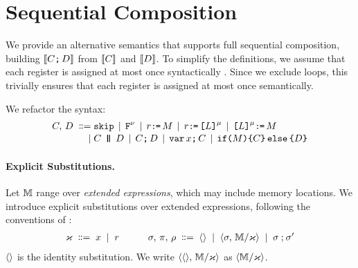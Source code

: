 \section{Sequential Composition}
\label{sec:semicolon}
We provide an alternative semantics that supports full sequential
composition, building $\llbracket C\texttt{;}\,\allowbreak D\rrbracket$ from $\llbracket C\rrbracket$ and
$\llbracket D\rrbracket$.  To simplify the definitions, we assume that each register is
assigned at most once syntactically
\cite{Rosen:1988:GVN:73560.73562}.  Since we exclude loops, this trivially ensures that each
register is assigned at most once semantically.

We refactor the syntax:
\begin{align*}
  \aCmd,\,\bCmd
  \BNFDEF& \SKIP
  \mkern-2mu\BNFSEP\mkern-2mu \FENCE^{\fmode}
  \mkern-2mu\BNFSEP\mkern-2mu \aReg\GETS\aExp
  \mkern-2mu\BNFSEP\mkern-2mu \aReg\GETS \REF{\cExp}^{\amode} 
  \mkern-2mu\BNFSEP\mkern-2mu \REF{\cExp}^{\amode}\GETS\aExp
  \\[-.5ex]
  \BNFSEP&\aCmd \PAR \bCmd
  \mkern-2mu\BNFSEP\mkern-2mu\aCmd \SEMI \bCmd
  \mkern-2mu\BNFSEP\mkern-2mu \VAR\aLoc\SEMI \aCmd
  \mkern-2mu\BNFSEP\mkern-2mu \IF{\aExp} \THEN \aCmd \ELSE \bCmd \FI
\end{align*}

\paragraph{Explicit Substitutions.}
Let $\mathbb{M}$ range over \emph{extended expressions}, which may include memory
locations.  We introduce explicit substitutions over extended expressions,
following the conventions of \citet{DBLP:conf/icalp/RitterP97}:
\begin{gather*}
  \aLocReg\BNFDEF \aLoc \BNFSEP \aReg
  \qquad\quad
  \aSub,\,\bSub,\, \SUBDRS{\dEvs} %
  \BNFDEF \SUBEMP \BNFSEP \SUBPAR{\aSub}{\aEExp/\aLocReg}
  \BNFSEP \aSub\SUBSEQ\aSub'
\end{gather*}
$\langle\rangle$ is the identity substitution.  We write
$\langle\langle\rangle,\,\mathbb{M}/\varkappa\rangle$ as $\langle\mathbb{M}/\varkappa\rangle$.

